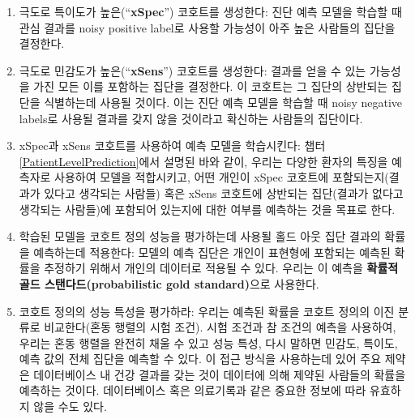 \documentclass[11pt]{book}
\providecommand{\tightlist}{%
  \setlength{\itemsep}{0pt}\setlength{\parskip}{0pt}}
\theoremstyle{definition}
\theoremstyle{definition}
\theoremstyle{definition}
\theoremstyle{remark}
\begin{document}
\begin{enumerate}
\def\labelenumi{\arabic{enumi}.}
\tightlist
\item
  극도로 특이도가 높은(``\textbf{xSpec}'') 코호트를 생성한다: 진단 예측
  모델을 학습할 때 관심 결과를 noisy positive label로 사용할 가능성이
  아주 높은 사람들의 집단을 결정한다.
\item
  극도로 민감도가 높은(``\textbf{xSens}'') 코호트를 생성한다: 결과를
  얻을 수 있는 가능성을 가진 모든 이를 포함하는 집단을 결정한다. 이
  코호트는 그 집단의 상반되는 집단을 식별하는데 사용될 것이다. 이는 진단
  예측 모델을 학습할 때 noisy negative labels로 사용될 결과를 갖지 않을
  것이라고 확신하는 사람들의 집단이다.
\item
  xSpec과 xSens 코호트를 사용하여 예측 모델을 학습시킨다: 챕터
  \ref{PatientLevelPrediction}에서 설명된 바와 같이, 우리는 다양한
  환자의 특징을 예측자로 사용하여 모델을 적합시키고, 어떤 개인이 xSpec
  코호트에 포함되는지(결과가 있다고 생각되는 사람들) 혹은 xSens 코호트에
  상반되는 집단(결과가 없다고 생각되는 사람들)에 포함되어 있는지에 대한
  여부를 예측하는 것을 목표로 한다.
\item
  학습된 모델을 코호트 정의 성능을 평가하는데 사용될 홀드 아웃 집단
  결과의 확률을 예측하는데 적용한다: 모델의 예측 집단은 개인이 표현형에
  포함되는 예측된 확률을 추정하기 위해서 개인의 데이터로 적용될 수 있다.
  우리는 이 예측을 \textbf{확률적 골드 스탠다드(probabilistic gold
  standard)}으로 사용한다.
\item
  코호트 정의의 성능 특성을 평가하라: 우리는 예측된 확률을 코호트 정의의
  이진 분류로 비교한다(혼동 행렬의 시험 조건). 시험 조건과 참 조건의
  예측을 사용하여, 우리는 혼동 행렬을 완전히 채울 수 있고 성능 특성,
  다시 말하면 민감도, 특이도, 예측 값의 전체 집단을 예측할 수 있다. 이
  접근 방식을 사용하는데 있어 주요 제약은 데이터베이스 내 건강 결과를
  갖는 것이 데이터에 의해 제약된 사람들의 확률을 예측하는 것이다.
  데이터베이스 혹은 의료기록과 같은 중요한 정보에 따라 유효하지 않을
  수도 있다.
\end{enumerate}
\end{document}
